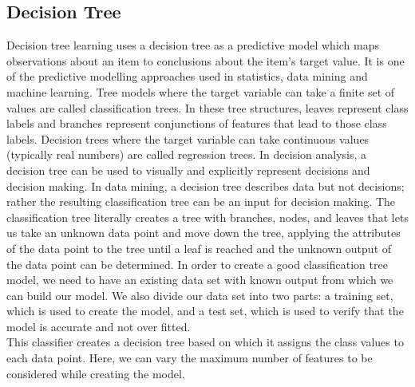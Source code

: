 \documentclass{book}
\begin{document}
    	\subsection{Decision Tree}
    	Decision tree learning uses a decision tree as a predictive model which maps observations about an item to conclusions about the item's target value. It is one of the predictive modelling approaches used in statistics, data mining and machine learning. Tree models where the target variable can take a finite set of values are called classification trees. In these tree structures, leaves represent class labels and branches represent conjunctions of features that lead to those class labels. Decision trees where the target variable can take continuous values (typically real numbers) are called regression trees. In decision analysis, a decision tree can be used to visually and explicitly represent decisions and decision making. In data mining, a decision tree describes data but not decisions; rather the resulting classification tree can be an input for decision making.
    	The classification tree literally creates a tree with branches, nodes, and leaves that lets us take an unknown data point and move down the tree, applying the attributes of the data point to the tree until a leaf is reached and the unknown output of the data point can be determined. In order to create a good classification tree model, we need to have an existing data set with known output from which we can build our model. We also divide our data set into two parts: a training set, which is used to create the model, and a test set, which is used to verify that the model is accurate and not over fitted. \\
    	This classifier creates a decision tree based on which it assigns the class values to each data point. Here, we can vary the maximum number of features to be considered while creating the model.\\
    	
\end{document}
